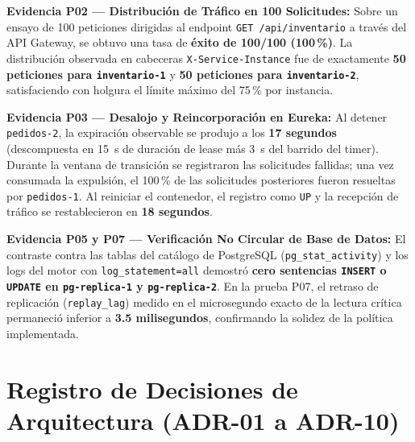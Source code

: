 \documentclass[12pt,a4paper]{article}
\begin{document}
\begin{tcolorbox}[formalbox]
\textbf{Evidencia P02 --- Distribuci\'{o}n de Tr\'{a}fico en 100 Solicitudes:}
Sobre un ensayo de 100 peticiones dirigidas al endpoint \texttt{GET /api/inventario} a trav\'{e}s del API Gateway, se obtuvo una tasa de \textbf{\'{e}xito de 100/100 (100\,\%)}. La distribuci\'{o}n observada en cabeceras \texttt{X-Service-Instance} fue de exactamente \textbf{50 peticiones para \texttt{inventario-1}} y \textbf{50 peticiones para \texttt{inventario-2}}, satisfaciendo con holgura el l\'{i}mite m\'{a}ximo del 75\,\% por instancia.
\end{tcolorbox}

\begin{tcolorbox}[formalbox]
\textbf{Evidencia P03 --- Desalojo y Reincorporaci\'{o}n en Eureka:}
Al detener \texttt{pedidos-2}, la expiraci\'{o}n observable se produjo a los \textbf{17 segundos} (descompuesta en 15~s de duraci\'{o}n de lease m\'{a}s 3~s del barrido del timer). Durante la ventana de transici\'{o}n se registraron las solicitudes fallidas; una vez consumada la expulsi\'{o}n, el 100\,\% de las solicitudes posteriores fueron resueltas por \texttt{pedidos-1}. Al reiniciar el contenedor, el registro como \texttt{UP} y la recepci\'{o}n de tr\'{a}fico se restablecieron en \textbf{18 segundos}.
\end{tcolorbox}

\begin{tcolorbox}[formalbox]
\textbf{Evidencia P05 y P07 --- Verificaci\'{o}n No Circular de Base de Datos:}
El contraste contra las tablas del cat\'{a}logo de PostgreSQL (\texttt{pg\_stat\_activity}) y los logs del motor con \texttt{log\_statement=all} demostr\'{o} \textbf{cero sentencias \texttt{INSERT} o \texttt{UPDATE} en \texttt{pg-replica-1} y \texttt{pg-replica-2}}. En la prueba P07, el retraso de replicaci\'{o}n (\texttt{replay\_lag}) medido en el microsegundo exacto de la lectura cr\'{i}tica permaneci\'{o} inferior a \textbf{3.5 milisegundos}, confirmando la solidez de la pol\'{i}tica implementada.
\end{tcolorbox}

\clearpage

\section{Registro de Decisiones de Arquitectura (ADR-01 a ADR-10)}
\end{document}
